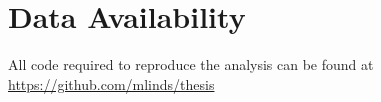 \chapter{Data Availability}
All code required to reproduce the analysis can be found at \url{https://github.com/mlinds/thesis}


